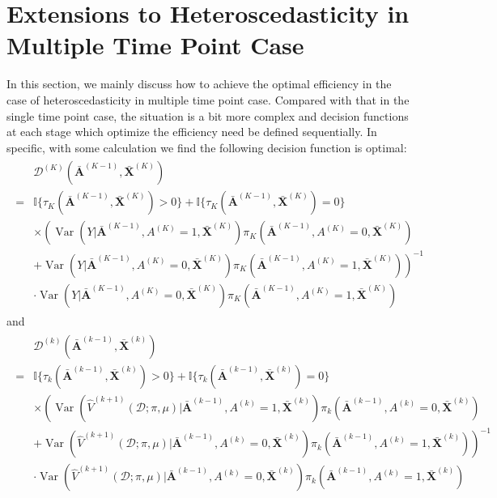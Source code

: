 \documentclass[11pt]{article}
\theoremstyle{referenceplain}
\theoremstyle{referencedefinition}
\theoremstyle{referenceremark}
\begin{document}
\section{Extensions to Heteroscedasticity in Multiple Time Point Case}\label{appD}
In this section, we mainly discuss how to achieve the optimal efficiency in the case of heteroscedasticity in multiple time point case. Compared with that in the single time point case, the situation is a bit more complex and decision functions at each stage which optimize the efficiency need be defined sequentially. In specific, with some calculation we find the following decision function is optimal:
\begin{align}\label{K-multi-heter}
\begin{aligned}
      &\mathcal{D}^{(K)}(\bar{\mathbf{A}}^{(K-1)},\bar{\mathbf{X}}^{(K)})\\
     =&\mathbb{I}\{\tau_K(\bar{\mathbf{A}}^{(K-1)},\bar{\mathbf{X}}^{(K)}) > 0\}+\mathbb{I}\{\tau_K(\bar{\mathbf{A}}^{(K-1)},\bar{\mathbf{X}}^{(K)}) = 0\}\\
   &\times\left(\operatorname{Var}(Y|\bar{\mathbf{A}}^{(K-1)},A^{(K)}=1,\bar{\mathbf{X}}^{(K)})\pi_K(\bar{\mathbf{A}}^{(K-1)},A^{(K)}=0,\bar{\mathbf{X}}^{(K)})\right.\\
   &+\left.\operatorname{Var}(Y|\bar{\mathbf{A}}^{(K-1)},A^{(K)}=0,\bar{\mathbf{X}}^{(K)})\pi_K(\bar{\mathbf{A}}^{(K-1)},A^{(K)}=1,\bar{\mathbf{X}}^{(K)})\right)^{-1}\\
   &\cdot \operatorname{Var}(Y|\bar{\mathbf{A}}^{(K-1)},A^{(K)}=0,\bar{\mathbf{X}}^{(K)})\pi_K(\bar{\mathbf{A}}^{(K-1)},A^{(K)}=1,\bar{\mathbf{X}}^{(K)})
\end{aligned}
\end{align}
and 
\begin{align}\label{k-1-multi-heter}
\begin{aligned}
     &\mathcal{D}^{(k)}(\bar{\mathbf{A}}^{(k-1)},\bar{\mathbf{X}}^{(k)})\\
   =&\mathbb{I}\{\tau_k(\bar{\mathbf{A}}^{(k-1)},\bar{\mathbf{X}}^{(k)}) > 0\}+\mathbb{I}\{\tau_k(\bar{\mathbf{A}}^{(k-1)},\bar{\mathbf{X}}^{(k)}) = 0\}\\
   &\times\left(\operatorname{Var}(\widehat{V}^{(k+1)}(\mathcal{D};\pi,\mu)|\bar{\mathbf{A}}^{(k-1)},A^{(k)}=1,\bar{\mathbf{X}}^{(k)})\pi_k(\bar{\mathbf{A}}^{(k-1)},A^{(k)}=0,\bar{\mathbf{X}}^{(k)})\right.\\
   &+\left.\operatorname{Var}(\widehat{V}^{(k+1)}(\mathcal{D};\pi,\mu)|\bar{\mathbf{A}}^{(k-1)},A^{(k)}=0,\bar{\mathbf{X}}^{(k)})\pi_k(\bar{\mathbf{A}}^{(k-1)},A^{(k)}=1,\bar{\mathbf{X}}^{(k)})\right)^{-1}\\
   &\cdot \operatorname{Var}(\widehat{V}^{(k+1)}(\mathcal{D};\pi,\mu)|\bar{\mathbf{A}}^{(k-1)},A^{(k)}=0,\bar{\mathbf{X}}^{(k)})\pi_k(\bar{\mathbf{A}}^{(k-1)},A^{(k)}=1,\bar{\mathbf{X}}^{(k)})
\end{aligned}
\end{align}
\end{document}
